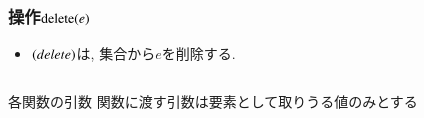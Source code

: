 \documentclass[main]{subfiles}
\begin{document}
\begin{frame}\frametitle{操作$\mathrm{delete}(e)$}
\begin{itemize}
	\item $\mathrm{}(delete)$は, 集合から$e$を削除する.\\
\end{itemize}

\begin{columns}[c]
	\begin{column}{0.5\linewidth}
		
	\end{column}
	\begin{column}{0.49\linewidth}
		
	\end{column}
\end{columns}
\begin{alertblock}{各関数の引数}
関数に渡す引数は要素として取りうる値のみとする
\end{alertblock}
\end{frame}
\end{document}
